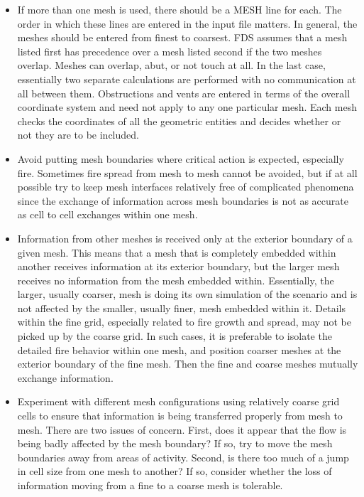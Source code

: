 \documentclass[11pt]{book}
\begin{document}
\begin{itemize}
\item If more than one mesh is used, there should be a
{\ct MESH} line for each. The order in which these
lines are entered in the input file matters. In general, the meshes should be entered
from finest to coarsest. FDS assumes that a mesh listed first has
precedence over a mesh listed second if the two meshes overlap.
Meshes can overlap, abut, or not touch at all. In the last case, essentially two separate
calculations are performed with no communication at all between them. Obstructions and vents are entered
in terms of the overall coordinate system and need not apply to any one particular mesh.
Each mesh checks the coordinates of all the geometric
entities and decides whether or not they are to be included.
\item Avoid putting mesh boundaries where critical action is expected,
especially fire. Sometimes fire spread from mesh to mesh cannot be
avoided, but if at all possible try to keep mesh interfaces relatively
free of complicated phenomena since the exchange of information across
mesh boundaries is not as accurate as cell to cell exchanges within one
mesh.
\item Information from other meshes is received only at the exterior boundary
of a given mesh. This means that a mesh that is completely embedded within
another receives information at its exterior boundary, but the larger
mesh receives no information from the mesh embedded within. Essentially,
the larger, usually coarser, mesh is doing its own simulation of the scenario
and is not affected by the smaller, usually finer, mesh embedded within it.
Details within the fine grid, especially related to fire growth and spread,
may not be picked up by the coarse grid. In such cases, it is preferable to
isolate the detailed fire behavior within one mesh, and position coarser
meshes at the exterior boundary of the fine mesh. Then the fine and coarse
meshes mutually exchange information.
\item Experiment with different mesh configurations using relatively
coarse grid cells to ensure that information is being transferred
properly from mesh to mesh. There are two issues of concern. First,
does it appear that the flow is being badly affected by the mesh boundary? If so,
try to move the mesh boundaries away from areas of activity. Second,
is there too much of a jump in cell size from one mesh to another? If so, consider
whether the loss of information moving from a fine to a coarse mesh is tolerable.

\end{itemize}
\end{document}
